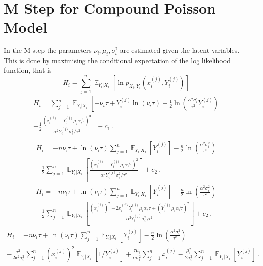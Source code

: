 \documentclass[12pt]{report}
\DeclareMathOperator{\expectation}{\mathbb{E}}
\begin{document}
\section{M Step for Compound Poisson Model}\label{chapter:mStep_compoundPoisson}
In the M step the parameters $\nu_i,\mu_i,\sigma_i^2$ are estimated given the latent variables. This is done by maximising the conditional expectation of the log likelihood function, that is
\begin{equation*}
H_i=\sum_{j=1}^n\expectation_{Y_i|X_i}\left[\ln p_{X_i,Y_i}\left(x_i^{(j)},Y_i^{(j)}\right)\right]
\end{equation*}
\begin{multline*}
H_i=\sum_{j=1}^n\expectation_{Y_i|X_i}\left[
-\nu_i\tau+Y_i^{(j)}\ln(\nu_i\tau)-\frac{1}{2}\ln\left(\frac{\alpha^2\sigma_i^2}{\tau^2}Y_i^{(j)}\right)
\right.
\\
\left.
-\frac{1}{2}\frac{\left(x_i^{(j)}-Y_i^{(j)}\mu_i\alpha/\tau\right)^2}{\alpha^2Y_i^{(j)}\sigma_i^2/\tau^2}
\right] + c_1 \ .
\end{multline*}
\begin{multline*}
H_i= -n\nu_i\tau+\ln(\nu_i\tau)\sum_{j=1}^n\expectation_{Y_i|X_i}\left[Y_i^{(j)}\right]-\frac{n}{2}\ln\left(\frac{\alpha^2\sigma_i^2}{\tau^2}\right)
\\
-\frac{1}{2}\sum_{j=1}^n\expectation_{Y_i|X_i}\left[\frac{\left(x_i^{(j)}-Y_i^{(j)}\mu_i\alpha/\tau\right)^2}{\alpha^2Y_i^{(j)}\sigma_i^2/\tau^2}\right]
 + c_2 \ .
\end{multline*}
\begin{multline*}
H_i= -n\nu_i\tau+\ln(\nu_i\tau)\sum_{j=1}^n\expectation_{Y_i|X_i}\left[Y_i^{(j)}\right]-\frac{n}{2}\ln\left(\frac{\alpha^2\sigma_i^2}{\tau^2}\right)
\\
-\frac{1}{2}\sum_{j=1}^n\expectation_{Y_i|X_i}\left[\frac{\left(x_i^{(j)}\right)^2-2x_i^{(j)}Y_i^{(j)}\mu_i\alpha/\tau+\left(Y_i^{(j)}\mu_i\alpha/\tau\right)^2}{\alpha^2Y_i^{(j)}\sigma_i^2/\tau^2}\right]
 + c_2 \ .
\end{multline*}
\begin{multline}
H_i= -n\nu_i\tau+\ln(\nu_i\tau)\sum_{j=1}^n\expectation_{Y_i|X_i}\left[Y_i^{(j)}\right]-\frac{n}{2}\ln\left(\frac{\alpha^2\sigma_i^2}{\tau^2}\right)
\\
-\frac{\tau^2}{2\alpha^2\sigma_i^2}\sum_{j=1}^n\left(x_i^{(j)}\right)^2\expectation_{Y_i|X_i}\left[1/Y_i^{(j)}\right]
+ \frac{\tau\mu_i}{\alpha\sigma_i^2}\sum_{j=1}^nx_i^{(j)}
-\frac{\mu_i^2}{2\sigma_i^2}\sum_{j=1}^n\expectation_{Y_i|X_i}\left[Y_i^{(j)}\right]
\ .
\end{multline}
\end{document}
